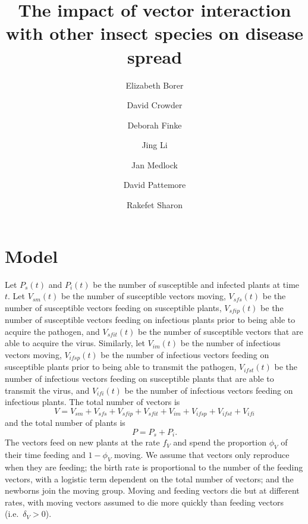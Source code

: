 \documentclass{article}
\title{The impact of vector interaction with other insect species on
  disease spread}
\author{
  Elizabeth Borer
  \and
  David Crowder
  \and
  Deborah Finke
  \and
  Jing Li
  \and
  Jan Medlock
  \and
  David Pattemore
  \and
  Rakefet Sharon
}
\begin{document}
\maketitle

\section{Model}

Let $P_s(t)$ and $P_i(t)$ be the number of susceptible and infected
plants at time $t$.  Let $V_{sm}(t)$ be the number of susceptible
vectors moving, $V_{sfs}(t)$ be the number of susceptible vectors
feeding on susceptible plants, $V_{sfip}(t)$ be the number of
susceptible vectors feeding on infectious plants prior to being able
to acquire the pathogen, and $V_{sfit}(t)$ be the number of
susceptible vectors that are able to acquire the virus.  Similarly,
let $V_{im}(t)$ be the number of infectious vectors moving,
$V_{ifsp}(t)$ be the number of infectious vectors feeding on
susceptible plants prior to being able to transmit the pathogen,
$V_{ifst}(t)$ be the number of infectious vectors feeding on
susceptible plants that are able to transmit the virus, and
$V_{ifi}(t)$ be the number of infectious vectors feeding on infectious
plants.  The total number of vectors is
\begin{equation}
  V = V_{sm} + V_{sfs} + V_{sfip} + V_{sfit} + V_{im} + V_{ifsp} +
  V_{ifst} + V_{ifi}
\end{equation}
and the total number of plants is
\begin{equation}
  P = P_s + P_i.
\end{equation}
The vectors feed on new plants at the rate $f_V$ and spend the
proportion $\phi_V$ of their time feeding and $1 - \phi_V$ moving.  We
assume that vectors only reproduce when they are feeding; the birth
rate is proportional to the number of the feeding vectors, with a
logistic term dependent on the total number of vectors; and the
newborns join the moving group.  Moving and feeding vectors die but at
different rates, with moving vectors assumed to die more quickly than
feeding vectors (i.e.~$\delta_V > 0$).
\end{document}
